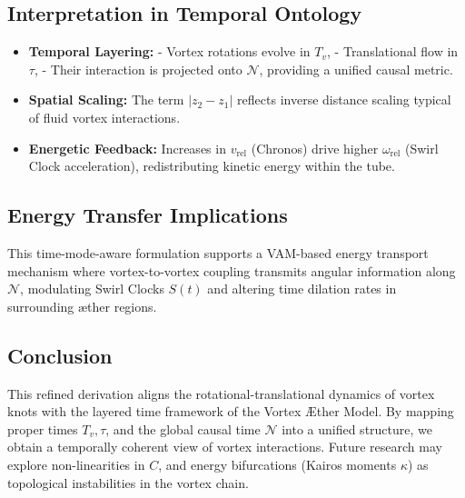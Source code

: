 \documentclass[12pt]{article}
\begin{document}
\subsection{Interpretation in Temporal Ontology}

    \begin{itemize}
        \item \textbf{Temporal Layering:}
        - Vortex rotations evolve in \( T_v \),
        - Translational flow in \( \tau \),
        - Their interaction is projected onto \( \mathcal{N} \), providing a unified causal metric.

        \item \textbf{Spatial Scaling:} The term \( |z_2 - z_1| \) reflects inverse distance scaling typical of fluid vortex interactions.

        \item \textbf{Energetic Feedback:} Increases in \( v_\text{rel} \) (Chronos) drive higher \( \omega_\text{rel} \) (Swirl Clock acceleration), redistributing kinetic energy within the tube.
    \end{itemize}

    \subsection*{Energy Transfer Implications}

    This time-mode-aware formulation supports a VAM-based energy transport mechanism where vortex-to-vortex coupling transmits angular information along \( \mathcal{N} \), modulating Swirl Clocks \( S(t) \) and altering time dilation rates in surrounding æther regions.

    \subsection*{Conclusion}

    This refined derivation aligns the rotational-translational dynamics of vortex knots with the layered time framework of the Vortex Æther Model. By mapping proper times \( T_v, \tau \), and the global causal time \( \mathcal{N} \) into a unified structure, we obtain a temporally coherent view of vortex interactions. Future research may explore non-linearities in \( C \), and energy bifurcations (Kairos moments \( \kappa \)) as topological instabilities in the vortex chain.



    \ifdefined\standalonechapter
    \else
    
    
    
\end{document}
